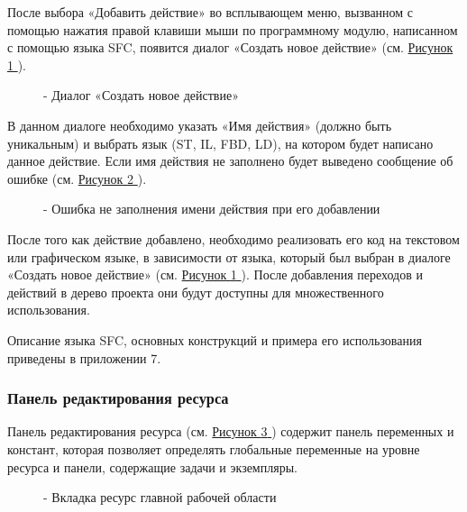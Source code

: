 \documentclass[letterpaper,10pt,russian]{sphinxmanual}
\begin{document}
После выбора «Добавить действие» во всплывающем меню, вызванном с
помощью нажатия правой клавиши мыши по программному модулю, написанном с
помощью языка SFC, появится диалог «Создать новое действие»
(см. \hyperref[usage_guide/ide_components:image114]{Рисунок \ref{usage_guide/ide_components:image114} }).
\begin{figure}[htbp]
\centering
\capstart

\noindent{}
\caption{- Диалог «Создать новое действие»}\label{usage_guide/ide_components:image114}\end{figure}

В данном диалоге необходимо указать «Имя действия» (должно быть
уникальным) и выбрать язык (ST, IL, FBD, LD), на котором будет написано
данное действие. Если имя действия не заполнено будет выведено сообщение
об ошибке (см. \hyperref[usage_guide/ide_components:image115]{Рисунок \ref{usage_guide/ide_components:image115} }).
\begin{figure}[htbp]
\centering
\capstart

\noindent{}
\caption{- Ошибка не заполнения имени действия при его добавлении}\label{usage_guide/ide_components:image115}\end{figure}

После того как действие добавлено, необходимо реализовать его код на
текстовом или графическом языке, в зависимости от языка, который был
выбран в диалоге «Создать новое действие» (см. \hyperref[usage_guide/ide_components:image114]{Рисунок \ref{usage_guide/ide_components:image114} }). После
добавления переходов и действий в дерево проекта они будут доступны для
множественного использования.

Описание языка SFC, основных конструкций и примера его использования
приведены в приложении 7.


\subsubsection{Панель редактирования ресурса}
\label{usage_guide/ide_components:id6}
Панель редактирования ресурса (см. \hyperref[usage_guide/ide_components:image116]{Рисунок \ref{usage_guide/ide_components:image116} }) содержит панель переменных и
констант, которая позволяет определять глобальные переменные на уровне
ресурса и панели, содержащие задачи и экземпляры.
\begin{figure}[htbp]
\centering
\capstart

\noindent{}
\caption{- Вкладка ресурс главной рабочей области}\label{usage_guide/ide_components:image116}\end{figure}
\end{document}
